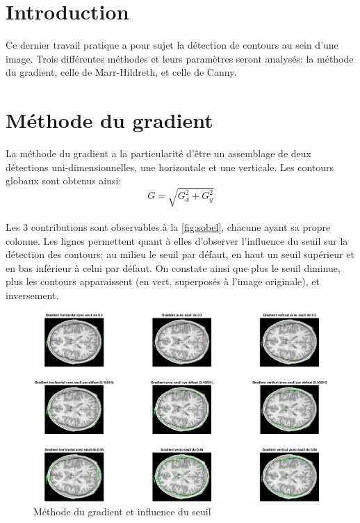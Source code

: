 \documentclass[12pt]{article}
\begin{document}
\section{Introduction}
Ce dernier travail pratique a pour sujet la détection de contours au sein d'une image. Trois différentes méthodes et leurs paramètres seront analysés: la méthode du gradient, celle de Marr-Hildreth, et celle de Canny.


\section{Méthode du gradient}
La méthode du gradient a la particularité d'être un assemblage de deux détections uni-dimensionnelles, une horizontale et une verticale. Les contours globaux sont obtenus ainsi:
\begin{equation}
	G = \sqrt{G_x^2 + G_y^2}
\end{equation}

\paragraph{}
Les 3 contributions sont observables à la \autoref{fig:sobel}, chacune ayant sa propre colonne. Les lignes permettent quant à elles d'observer l'influence du seuil sur la détection des contours: au milieu le seuil par défaut, en haut un seuil supérieur et en bas inférieur à celui par défaut. On constate ainsi que plus le seuil diminue, plus les contours apparaissent (en vert, superposés à l'image originale), et inversement.


\begin{figure}[!h]
  \centering
  \includegraphics[width = \textwidth]{sobel2}
  \caption{Méthode du gradient et influence du seuil}
  \label{fig:sobel}
\end{figure}
\end{document}
